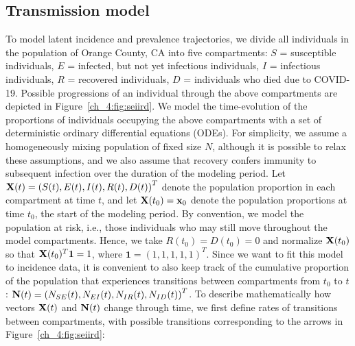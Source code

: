 \subsection{Transmission model}
\label{ch_4:subsec:model}
To model latent incidence and prevalence trajectories, we divide all individuals in the population of Orange County, CA into five compartments: $S$ = susceptible individuals, $E$ = infected, but not yet infectious individuals, $I$ = infectious individuals, $R$ = recovered individuals, $D$ = individuals who died due to COVID-19.
Possible progressions of an individual through the above compartments are depicted in Figure~\ref{ch_4:fig:seiird}.
We model the time-evolution of the proportions of individuals occupying the above compartments with a set of deterministic ordinary differential equations (ODEs).
For simplicity, we assume a homogeneously mixing population of fixed size \( N \), although it is possible to relax these assumptions, and we also assume that recovery confers immunity to subsequent infection over the duration of the modeling period.
Let $\mathbf{X}(t) = \left(S(t), E(t), I(t), R(t), D(t) \right)^T$ denote the population proportion in each compartment at time $t$, and let $\mathbf{X}(t_0) = \mathbf{x}_0 $ denote the population proportions at time $ t_0 $, the start of the modeling period.
By convention, we model the population at risk, i.e., those individuals who may still move throughout the model compartments.
Hence, we take $R(t_0) = D(t_0) = 0$ and normalize $ \mathbf{X}(t_0) $ so that $ \mathbf{X}(t_0)^T\boldsymbol{1} = 1$, where $\boldsymbol{1} = (1,1,1,1,1)^T$.
Since we want to fit this model to incidence data, it is convenient to also keep track of the cumulative proportion of the population that experiences transitions between compartments from $t_0$ to $t$: $ \mathbf{N}(t) = \left(N_{SE}(t), N_{E I}(t), N_{I R}(t), N_{I D}(t)\right)^T$.
To describe mathematically how vectors $\mathbf{X}(t)$ and $\mathbf{N}(t)$ change through time, we first define rates of transitions between compartments, with possible transitions corresponding to the arrows in Figure~\ref{ch_4:fig:seiird}:

